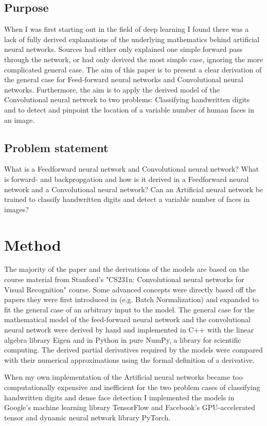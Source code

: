 \documentclass[a4paper,11pt,twoside]{article}
\begin{document}
\subsection{Purpose}
When I was first starting out in the field of deep learning I found there was a lack of fully derived explanations of the underlying mathematics behind artificial neural networks. Sources had either only explained one simple forward pass through the network, or had only derived the most simple case, ignoring the more complicated general case. The aim of this paper is to present a clear derivation of the general case for Feed-forward neural networks and Convolutional neural networks. Furthermore, the aim is to apply the derived model of the Convolutional neural network to two problems: Classifying handwritten digits and to detect and pinpoint the location of a variable number of human faces in an image.

\subsection{Problem statement}
What is a Feedforward neural network and Convolutional neural network?
What is forward- and backpropgation and how is it derived in a Feedforward neural network and a Convolutional neural network?
Can an Artificial neural network be trained to classify handwritten digits and detect a variable number of faces in images?

\newpage
\section{Method}
The majority of the paper and the derivations of the models are based on the course material from Stanford's "CS231n: Convolutional neural networks for Visual Recognition" course. Some advanced concepts were directly based off the papers they were first introduced in (e.g. Batch Normalization) and expanded to fit the general case of an arbitrary input to the model. The general case for the mathematical model of the feed-forward neural network and the convolutional neural network were derived by hand and implemented in C++ with the linear algebra library Eigen and in Python in pure NumPy, a library for scientific computing. The derived partial derivatives required by the models were compared with their numerical approximations using the formal definition of a derivative. 

When my own implementation of the Artificial neural networks became too computationally expensive and inefficient for the two problem cases of classifying handwritten digits and dense face detection I implemented the models in Google's machine learning library TensorFlow and Facebook's GPU-accelerated tensor and dynamic neural network library PyTorch.
\end{document}
